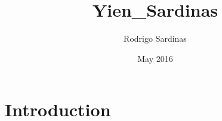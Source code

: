 \documentclass{article}
\title{Yien_Sardinas}
\author{Rodrigo Sardinas}
\date{May 2016}
\begin{document}
\maketitle

\section{Introduction}
\end{document}
